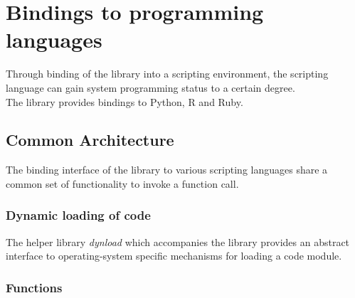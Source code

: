 %
%
%
%

\newpage
\section{Bindings to programming languages}

Through binding of the  library into a scripting environment,
the scripting language can gain system programming status to a certain degree.\\
The  library provides bindings to Python, R and Ruby.

\subsection{Common Architecture}

The binding interface of the  library to various scripting
languages share a common set of functionality to invoke a function call.

\subsubsection{Dynamic loading of code}

The helper library \emph{dynload} which accompanies the 
library provides an abstract interface to operating-system specific mechanisms
for loading a code module.

\subsubsection{Functions}

